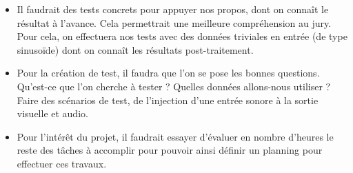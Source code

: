 \documentclass[a4paper]{article}
\begin{document}
\begin{itemize}
\item Il faudrait des tests concrets pour appuyer nos propos, dont on connaît le résultat à l'avance. Cela permettrait une meilleure compréhension au jury. Pour cela, on effectuera nos tests avec des données triviales en entrée (de type sinusoïde) dont on connaît les résultats post-traitement.

\item Pour la création de test, il faudra que l'on se pose les bonnes questions. Qu'est-ce que l'on cherche à tester ? Quelles données allons-nous utiliser ? Faire des scénarios de test, de l'injection d'une entrée sonore à la sortie visuelle et audio.

\item Pour l'intérêt du projet, il faudrait essayer d'évaluer en nombre d'heures le reste des tâches à accomplir pour pouvoir ainsi définir un planning pour effectuer ces travaux.
\end{itemize}
\end{document}
